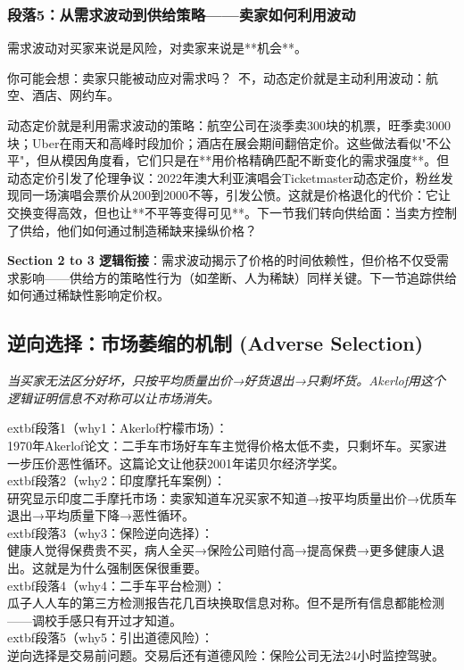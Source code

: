 \documentclass[a4paper,12pt]{book}
\newenvironment{motivation}{\begin{tcolorbox}[colback=gray!10,colframe=gray!60,title=\textit{本章动机},fonttitle=\bfseries,arc=0mm,leftrule=3mm]\small\itshape}{\end{tcolorbox}}
\begin{document}
	\subsubsection*{段落5：从需求波动到供给策略——卖家如何利用波动}
	需求波动对买家来说是风险，对卖家来说是**机会**。
	\begin{tcolorbox}[colback=yellow!5, title=\textit{读者行为预测}]
		你可能会想：卖家只能被动应对需求吗？\ 不，动态定价就是主动利用波动：航空、酒店、网约车。
	\end{tcolorbox}

动态定价就是利用需求波动的策略：航空公司在淡季卖300块的机票，旺季卖3000块；Uber在雨天和高峰时段加价；酒店在展会期间翻倍定价。这些做法看似"不公平"，但从模因角度看，它们只是在**用价格精确匹配不断变化的需求强度**。但动态定价引发了伦理争议：2022年澳大利亚演唱会Ticketmaster动态定价，粉丝发现同一场演唱会票价从200到2000不等，引发公愤。这就是价格退化的代价：它让交换变得高效，但也让**不平等变得可见**。下一节我们转向供给面：当卖方控制了供给，他们如何通过制造稀缺来操纵价格？

	\textbf{Section 2 to 3 逻辑衔接}：需求波动揭示了价格的时间依赖性，但价格不仅受需求影响——供给方的策略性行为（如垄断、人为稀缺）同样关键。下一节追踪供给如何通过稀缺性影响定价权。

	
	\subsection{逆向选择：市场萎缩的机制 (Adverse Selection)}
	\begin{motivation}当买家无法区分好坏，只按平均质量出价→好货退出→只剩坏货。Akerlof用这个逻辑证明信息不对称可以让市场消失。\end{motivation}
		extbf{段落1（why1：Akerlof柠檬市场）}：\\1970年Akerlof论文：二手车市场好车车主觉得价格太低不卖，只剩坏车。买家进一步压价恶性循环。这篇论文让他获2001年诺贝尔经济学奖。\\	extbf{段落2（why2：印度摩托车案例）}：\\研究显示印度二手摩托市场：卖家知道车况买家不知道→按平均质量出价→优质车退出→平均质量下降→恶性循环。\\	extbf{段落3（why3：保险逆向选择）}：\\健康人觉得保费贵不买，病人全买→保险公司赔付高→提高保费→更多健康人退出。这就是为什么强制医保很重要。\\	extbf{段落4（why4：二手车平台检测）}：\\瓜子人人车的第三方检测报告花几百块换取信息对称。但不是所有信息都能检测——调校手感只有开过才知道。\\	extbf{段落5（why5：引出道德风险）}：\\逆向选择是交易前问题。交易后还有道德风险：保险公司无法24小时监控驾驶。
\end{document}
